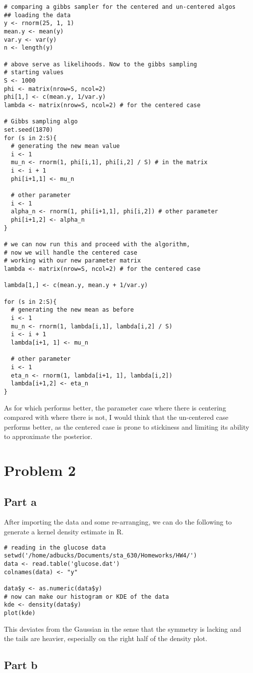 \documentclass[12pt, letterpaper]{article}
\begin{document}
\begin{verbatim}
# comparing a gibbs sampler for the centered and un-centered algos 
## loading the data 
y <- rnorm(25, 1, 1)
mean.y <- mean(y)
var.y <- var(y)
n <- length(y)

# above serve as likelihoods. Now to the gibbs sampling 
# starting values 
S <- 1000
phi <- matrix(nrow=S, ncol=2)
phi[1,] <- c(mean.y, 1/var.y)
lambda <- matrix(nrow=S, ncol=2) # for the centered case 

# Gibbs sampling algo 
set.seed(1870)
for (s in 2:S){
  # generating the new mean value 
  i <- 1
  mu_n <- rnorm(1, phi[i,1], phi[i,2] / S) # in the matrix 
  i <- i + 1
  phi[i+1,1] <- mu_n 
  
  # other parameter 
  i <- 1
  alpha_n <- rnorm(1, phi[i+1,1], phi[i,2]) # other parameter 
  phi[i+1,2] <- alpha_n
}

# we can now run this and proceed with the algorithm, 
# now we will handle the centered case 
# working with our new parameter matrix 
lambda <- matrix(nrow=S, ncol=2) # for the centered case 

lambda[1,] <- c(mean.y, mean.y + 1/var.y)

for (s in 2:S){
  # generating the new mean as before 
  i <- 1
  mu_n <- rnorm(1, lambda[i,1], lambda[i,2] / S)
  i <- i + 1
  lambda[i+1, 1] <- mu_n
  
  # other parameter 
  i <- 1
  eta_n <- rnorm(1, lambda[i+1, 1], lambda[i,2])
  lambda[i+1,2] <- eta_n 
}
\end{verbatim}

As for which performs better, the parameter case where there is centering compared with where there is not, I would think that the un-centered case performs better, as the centered case is prone to stickiness and limiting its ability to approximate the posterior. 

\section{Problem 2} 

\subsection{Part a} 

After importing the data and some re-arranging, we can do the following to generate a kernel density estimate in R. 

\begin{verbatim}
# reading in the glucose data 
setwd('/home/adbucks/Documents/sta_630/Homeworks/HW4/')
data <- read.table('glucose.dat')
colnames(data) <- "y"

data$y <- as.numeric(data$y)
# now can make our histogram or KDE of the data 
kde <- density(data$y)
plot(kde)
\end{verbatim}

This deviates from the Gaussian in the sense that the symmetry is lacking and the tails are heavier, especially on the right half of the density plot. 

\subsection{Part b} 
\end{document}
